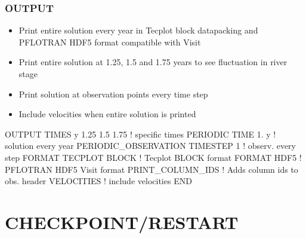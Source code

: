 \documentclass{beamer}
\newcommand\bluecomment[1]{{{\color{blue} #1}}}
\begin{document}
\begin{frame}[fragile]\frametitle{\bf OUTPUT}

\begin{itemize}
\item Print entire solution every year in Tecplot block datapacking and PFLOTRAN HDF5 format compatible with Visit
\item Print entire solution at 1.25, 1.5 and 1.75 years to see fluctuation in river stage
\item Print solution at observation points every time step
\item Include velocities when entire solution is printed
\end{itemize}

\begin{semiverbatim}

OUTPUT
  TIMES y 1.25 1.5 1.75  \bluecomment{! specific times}
  PERIODIC TIME 1. y     \bluecomment{! solution every year}
  PERIODIC_OBSERVATION TIMESTEP 1  \bluecomment{! observ. every step}
  FORMAT TECPLOT BLOCK   \bluecomment{! Tecplot BLOCK format}
  FORMAT HDF5            \bluecomment{! PFLOTRAN HDF5 Visit format}
  PRINT_COLUMN_IDS       \bluecomment{! Adds column ids to obs. header}
  VELOCITIES             \bluecomment{! include velocities}
END
\end{semiverbatim}

\end{frame}

\section{CHECKPOINT/RESTART}
\end{document}
